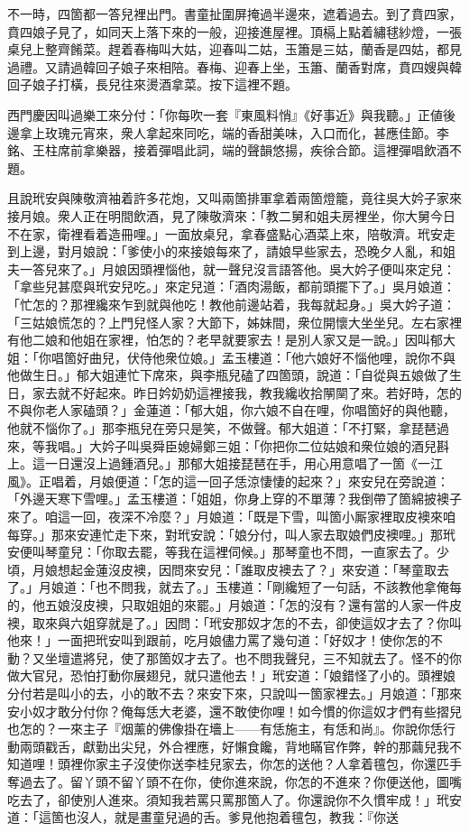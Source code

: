 不一時，四箇都一答兒裡出門。書童扯圍屏掩過半邊來，遮着過去。到了賁四家，賁四娘子見了，如同天上落下來的一般，迎接進屋裡。頂槅上點着繡毬紗燈，一張桌兒上整齊餚菜。趕着春梅叫大姑，迎春叫二姑，玉簫是三姑，蘭香是四姑，都見過禮。又請過韓回子娘子來相陪。春梅、迎春上坐，玉簫、蘭香對席，賁四嫂與韓回子娘子打橫，長兒往來燙酒拿菜。按下這裡不題。

西門慶因叫過樂工來分付：「你每吹一套『東風料悄』《好事近》與我聽。」正値後邊拿上玫瑰元宵來，衆人拿起來同吃，端的香甜美味，入口而化，甚應佳節。李銘、王柱席前拿樂器，接着彈唱此詞，端的聲韻悠揚，疾徐合節。這裡彈唱飲酒不題。

且說玳安與陳敬濟袖着許多花炮，又叫兩箇排軍拿着兩箇燈籠，竟往吳大妗子家來接月娘。衆人正在明間飲酒，見了陳敬濟來：「教二舅和姐夫房裡坐，你大舅今日不在家，衛裡看着造冊哩。」一面放桌兒，拿春盛點心酒菜上來，陪敬濟。玳安走到上邊，對月娘說：「爹使小的來接娘每來了，請娘早些家去，恐晚夕人亂，和姐夫一答兒來了。」月娘因頭裡惱他，就一聲兒沒言語答他。吳大妗子便叫來定兒：「拿些兒甚麼與玳安兒吃。」來定兒道：「酒肉湯飯，都前頭擺下了。」吳月娘道：「忙怎的？那裡纔來乍到就與他吃！教他前邊站着，我每就起身。」吳大妗子道：「三姑娘慌怎的？上門兒怪人家？大節下，姊妹間，衆位開懷大坐坐兒。左右家裡有他二娘和他姐在家裡，怕怎的？老早就要家去！是別人家又是一說。」因叫郁大姐：「你唱箇好曲兒，伏侍他衆位娘。」孟玉樓道：「他六娘好不惱他哩，說你不與他做生日。」郁大姐連忙下席來，與李瓶兒磕了四箇頭，說道：「自從與五娘做了生日，家去就不好起來。昨日妗奶奶這裡接我，教我纔收拾䦛䦟了來。若好時，怎的不與你老人家磕頭？」金蓮道：「郁大姐，你六娘不自在哩，你唱箇好的與他聽，他就不惱你了。」那李瓶兒在旁只是笑，不做聲。{}郁大姐道：「不打緊，拿琵琶過來，等我唱。」大妗子叫吳舜臣媳婦鄭三姐：「你把你二位姑娘和衆位娘的酒兒斟上。這一日還沒上過鍾酒兒。」那郁大姐接琵琶在手，用心用意唱了一箇《一江風》。正唱着，月娘便道：「怎的這一回子恁涼悽悽的起來？」來安兒在旁說道：「外邊天寒下雪哩。」孟玉樓道：「姐姐，你身上穿的不單薄？我倒帶了箇綿披襖子來了。咱這一回，夜深不冷麼？」月娘道：「既是下雪，叫箇小厮家裡取皮襖來咱每穿。」那來安連忙走下來，對玳安說：「娘分付，叫人家去取娘們皮襖哩。」那玳安便叫琴童兒：「你取去罷，等我在這裡伺候。」那琴童也不問，一直家去了。少頃，月娘想起金蓮沒皮襖，因問來安兒：「誰取皮襖去了？」來安道：「琴童取去了。」月娘道：「也不問我，就去了。」玉樓道：「剛纔短了一句話，不該教他拿俺每的，他五娘沒皮襖，只取姐姐的來罷。」月娘道：「怎的沒有？還有當的人家一件皮襖，取來與六姐穿就是了。」因問：「玳安那奴才怎的不去，卻使這奴才去了？你叫他來！」一面把玳安叫到跟前，吃月娘儘力罵了幾句道：「好奴才！使你怎的不動？又坐壇遣將兒，使了那箇奴才去了。也不問我聲兒，三不知就去了。怪不的你做大官兒，恐怕打動你展翅兒，就只遣他去！」玳安道：「娘錯怪了小的。頭裡娘分付若是叫小的去，小的敢不去？來安下來，只說叫一箇家裡去。」月娘道：「那來安小奴才敢分付你？俺每恁大老婆，還不敢使你哩！如今慣的你這奴才們有些摺兒也怎的？一來主子『烟薰的佛像掛在墻上——有恁施主，有恁和尚』。你說你恁行動兩頭戳舌，獻勤出尖兒，外合裡應，好懶食饞，背地瞞官作弊，幹的那繭兒我不知道哩！頭裡你家主子沒使你送李桂兒家去，你怎的送他？人拿着氊包，你還匹手奪過去了。留丫頭不留丫頭不在你，使你進來說，你怎的不進來？你便送他，圖嘴吃去了，卻使別人進來。須知我若罵只罵那箇人了。你還說你不久慣牢成！」玳安道：「這箇也沒人，就是畫童兒過的舌。爹見他抱着氊包，教我：『你送